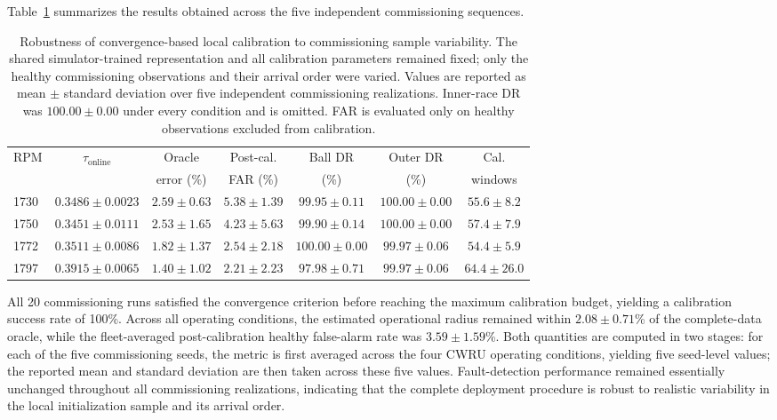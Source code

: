 \documentclass{trbunofficial}
\begin{document}
Table~\ref{tab:initialization-robustness} summarizes the results obtained
across the five independent commissioning sequences.
\begin{table}[!ht]
\centering
\caption{Robustness of convergence-based local calibration to commissioning
sample variability. The shared simulator-trained representation and all
calibration parameters remained fixed; only the healthy commissioning
observations and their arrival order were varied. Values are reported as
mean $\pm$ standard deviation over five independent commissioning
realizations. Inner-race DR was $100.00 \pm 0.00$ under every condition and
is omitted. FAR is evaluated only on healthy observations excluded from
calibration.}
\label{tab:initialization-robustness}
\setlength{\tabcolsep}{5pt}
\begin{tabular}{@{}lcccccc@{}}
\toprule
RPM & $\tau_{\mathrm{online}}$ & Oracle    & Post-cal. & Ball DR & Outer DR & Cal.    \\
    &                          & error (\%) & FAR (\%)  & (\%)    & (\%)     & windows \\
\midrule

1730 & $0.3486 \pm 0.0023$ & $2.59 \pm 0.63$ & $5.38 \pm 1.39$
     & $99.95 \pm 0.11$ & $100.00 \pm 0.00$ & $55.6 \pm 8.2$ \\

1750 & $0.3451 \pm 0.0111$ & $2.53 \pm 1.65$ & $4.23 \pm 5.63$
     & $99.90 \pm 0.14$ & $100.00 \pm 0.00$ & $57.4 \pm 7.9$ \\

1772 & $0.3511 \pm 0.0086$ & $1.82 \pm 1.37$ & $2.54 \pm 2.18$
     & $100.00 \pm 0.00$ & $99.97 \pm 0.06$ & $54.4 \pm 5.9$ \\

1797 & $0.3915 \pm 0.0065$ & $1.40 \pm 1.02$ & $2.21 \pm 2.23$
     & $97.98 \pm 0.71$ & $99.97 \pm 0.06$ & $64.4 \pm 26.0$ \\

\bottomrule
\end{tabular}
\end{table}

All 20 commissioning runs satisfied the convergence criterion before
reaching the maximum calibration budget, yielding a calibration success
rate of 100\%. Across all operating conditions, the estimated operational
radius remained within $2.08 \pm 0.71$\% of the complete-data oracle, while
the fleet-averaged post-calibration healthy false-alarm rate was
$3.59 \pm 1.59$\%. Both quantities are computed in two stages: for each of
the five commissioning seeds, the metric is first averaged across the four
CWRU operating conditions, yielding five seed-level values; the reported
mean and standard deviation are then taken across these five values.
Fault-detection performance remained essentially unchanged throughout all
commissioning realizations, indicating that the complete deployment
procedure is robust to realistic variability in the local initialization
sample and its arrival order.
\end{document}
